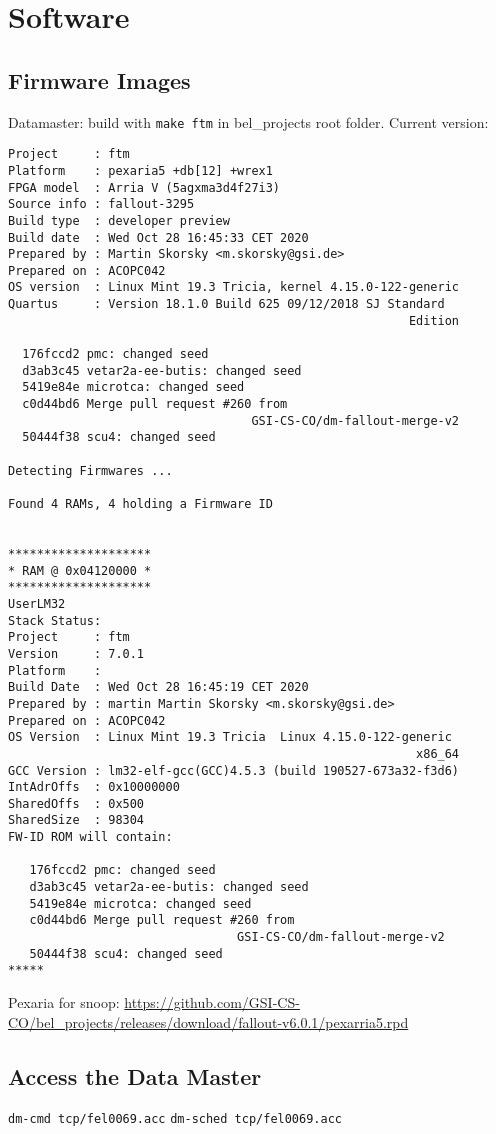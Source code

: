 \documentclass[12pt,a4paper]{report}
\begin{document}
\chapter{Software}
\section{Firmware Images}
Datamaster: build with \texttt{make ftm} in bel\_projects root folder. Current version:
\begin{verbatim}
Project     : ftm
Platform    : pexaria5 +db[12] +wrex1
FPGA model  : Arria V (5agxma3d4f27i3)
Source info : fallout-3295
Build type  : developer preview
Build date  : Wed Oct 28 16:45:33 CET 2020
Prepared by : Martin Skorsky <m.skorsky@gsi.de>
Prepared on : ACOPC042
OS version  : Linux Mint 19.3 Tricia, kernel 4.15.0-122-generic
Quartus     : Version 18.1.0 Build 625 09/12/2018 SJ Standard
                                                        Edition

  176fccd2 pmc: changed seed
  d3ab3c45 vetar2a-ee-butis: changed seed
  5419e84e microtca: changed seed
  c0d44bd6 Merge pull request #260 from
                                  GSI-CS-CO/dm-fallout-merge-v2
  50444f38 scu4: changed seed

Detecting Firmwares ...

Found 4 RAMs, 4 holding a Firmware ID


********************
* RAM @ 0x04120000 *
********************
UserLM32
Stack Status:
Project     : ftm
Version     : 7.0.1
Platform    :
Build Date  : Wed Oct 28 16:45:19 CET 2020
Prepared by : martin Martin Skorsky <m.skorsky@gsi.de>
Prepared on : ACOPC042
OS Version  : Linux Mint 19.3 Tricia  Linux 4.15.0-122-generic
                                                         x86_64
GCC Version : lm32-elf-gcc(GCC)4.5.3 (build 190527-673a32-f3d6)
IntAdrOffs  : 0x10000000
SharedOffs  : 0x500
SharedSize  : 98304
FW-ID ROM will contain:

   176fccd2 pmc: changed seed
   d3ab3c45 vetar2a-ee-butis: changed seed
   5419e84e microtca: changed seed
   c0d44bd6 Merge pull request #260 from
                                GSI-CS-CO/dm-fallout-merge-v2
   50444f38 scu4: changed seed
*****
\end{verbatim}

Pexaria for snoop: \url{https://github.com/GSI-CS-CO/bel\_projects/releases/download/fallout-v6.0.1/pexarria5.rpd}

\section{Access the Data Master}
\texttt{dm-cmd tcp/fel0069.acc}
\linebreak
\texttt{dm-sched tcp/fel0069.acc}
\end{document}
